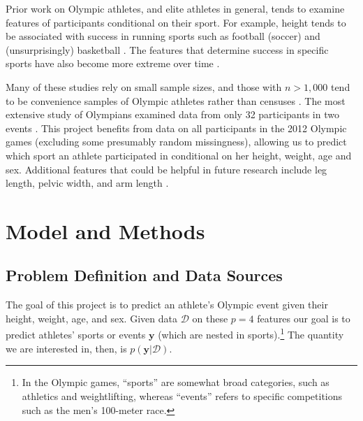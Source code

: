 \documentclass[12pt,letterpaper]{article} %
\begin{document}

Prior work on Olympic athletes, and elite athletes in general, tends to examine features of participants conditional on their sport. For example, height tends to be associated with success in running sports such as football (soccer) and (unsurprisingly) basketball \citep{reilly2000anthropometric,norton2001morphological}. The features that determine success in specific sports have also become more extreme over time \citep{willer2009six,lozovina2012morphological}.

Many of these studies rely on small sample sizes, and those with $n>1,000$ tend to be convenience samples of Olympic athletes rather than censuses \citep{de1974genetic}. The most extensive study of Olympians examined data from only 32 participants in two events \citep{khosla1985age}. This project benefits from data on all participants in the 2012 Olympic games (excluding some presumably random missingness), allowing us to predict which sport an athlete participated in conditional on her height, weight, age and sex. Additional features that could be helpful in future research include leg length, pelvic width, and arm length \citep{lohman2012current}. 

\section{Model and Methods}

\subsection{Problem Definition and Data Sources}

The goal of this project is to predict an athlete's Olympic event given their height, weight, age, and sex. Given data $\mathcal{D}$ on these $p=4$ features our goal is to predict athletes' sports or events $\mathbf{y}$ (which are nested in sports).\footnote{In the Olympic games, ``sports'' are somewhat broad categories, such as athletics and weightlifting, whereas ``events'' refers to specific competitions such as the men's 100-meter race.} The quantity we are interested in, then, is $p(\mathbf{y}|\mathcal{D})$.
\end{document}
